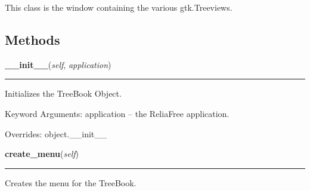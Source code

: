 This class is the window containing the various gtk.Treeviews.



  \subsection{Methods}

    \vspace{0.5ex}

\hspace{.8\funcindent}\begin{boxedminipage}{\funcwidth}

    \raggedright \textbf{\_\_init\_\_}(\textit{self}, \textit{application})

    \vspace{-1.5ex}

    \rule{\textwidth}{0.5\fboxrule}
\setlength{\parskip}{2ex}
    Initializes the TreeBook Object.

    Keyword Arguments: application -- the ReliaFree application.

\setlength{\parskip}{1ex}
      Overrides: object.\_\_init\_\_

    \end{boxedminipage}

    \label{reliafree:tree:TreeWindow:create_menu}

    \vspace{0.5ex}

\hspace{.8\funcindent}\begin{boxedminipage}{\funcwidth}

    \raggedright \textbf{create\_menu}(\textit{self})

    \vspace{-1.5ex}

    \rule{\textwidth}{0.5\fboxrule}
\setlength{\parskip}{2ex}
    Creates the menu for the TreeBook.

\setlength{\parskip}{1ex}
    \end{boxedminipage}

    \label{reliafree:tree:TreeWindow:create_toolbar}

